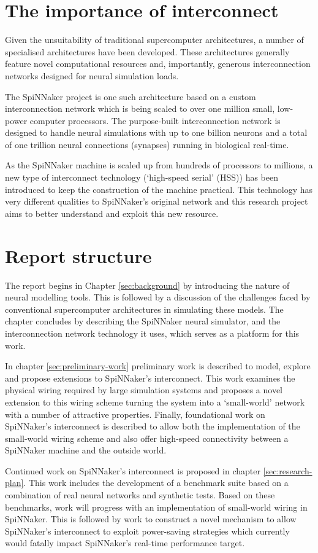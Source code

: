 	\section{The importance of interconnect}
		
		Given the unsuitability of traditional supercomputer architectures, a number
		of specialised architectures have been developed. These architectures
		generally feature novel computational resources and, importantly, generous
		interconnection networks designed for neural simulation loads.
		
		The SpiNNaker project \cite{furber06} is one such architecture based on a
		custom interconnection network which is being scaled to over one million
		small, low-power computer processors. The purpose-built interconnection
		network is designed to handle neural simulations with up to one billion
		neurons and a total of one trillion neural connections (synapses) running in
		biological real-time.
		
		As the SpiNNaker machine is scaled up from hundreds of processors to
		millions, a new type of interconnect technology (`high-speed serial' (HSS))
		has been introduced to keep the construction of the machine practical. This
		technology has very different qualities to SpiNNaker's original network and
		this research project aims to better understand and exploit this new
		resource.
		
		\section{Report structure}
			
			The report begins in Chapter \ref{sec:background} by introducing the
			nature of neural modelling tools. This is followed by a discussion of the
			challenges faced by conventional supercomputer architectures in
			simulating these models. The chapter concludes by describing the SpiNNaker
			neural simulator, and the interconnection network technology it uses,
			which serves as a platform for this work.
			
			In chapter \ref{sec:preliminary-work} preliminary work is described to
			model, explore and propose extensions to SpiNNaker's interconnect. This
			work examines the physical wiring required by large simulation systems and
			proposes a novel extension to this wiring scheme turning the system into a
			`small-world' network with a number of attractive properties. Finally,
			foundational work on SpiNNaker's interconnect is described to allow both
			the implementation of the small-world wiring scheme and also offer
			high-speed connectivity between a SpiNNaker machine and the outside world.
			
			Continued work on SpiNNaker's interconnect is proposed in chapter
			\ref{sec:research-plan}. This work includes the development of a benchmark
			suite based on a combination of real neural networks and synthetic tests.
			Based on these benchmarks, work will progress with an implementation of
			small-world wiring in SpiNNaker. This is followed by work to construct a
			novel mechanism to allow SpiNNaker's interconnect to exploit power-saving
			strategies which currently would fatally impact SpiNNaker's real-time
			performance target.
